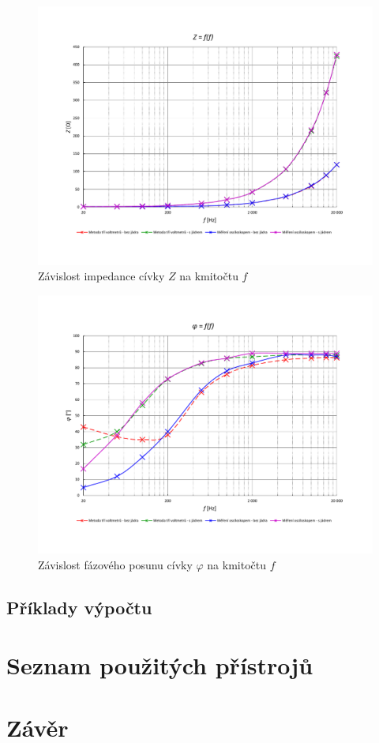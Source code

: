 \documentclass[a4paper, czech]{article}
\begin{document}
\begin{figure}[H]
    \centering
    \includegraphics[width=\textwidth, trim={0 2.5cm 0 3cm}]{grafy/9B_graf3.pdf}
    \caption{Závislost impedance cívky $Z$ na kmitočtu $f$}
\end{figure}

\begin{figure}[H]
    \centering
    \includegraphics[width=\textwidth, trim={0 2.5cm 0 3cm}]{grafy/9B_graf4.pdf}
    \caption{Závislost fázového posunu cívky $\varphi$ na kmitočtu $f$}
\end{figure}

\subsection{Příklady výpočtu}

\section{Seznam použitých přístrojů}

\section{Závěr}
\end{document}

